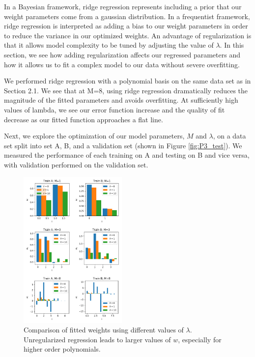 \documentclass[10pt, twocolumn]{article}
\begin{document}
In a Bayesian framework, ridge regression represents including a prior that our weight parameters come from a gaussian distribution. In a frequentist framework, ridge regression is interpreted as adding a bias to our weight parameters in order to reduce the variance in our optimized weights. An advantage of regularization is that it allows model complexity to be tuned by adjusting the value of $\lambda$. In this section, we see how adding regularization affects our regressed parameters and how it allows us to fit a complex model to our data without severe overfitting.


We performed ridge regression with a polynomial basis on the same data set as in Section 2.1. We see that at M=8, using ridge regression dramatically reduces the magnitude of the fitted parameters and avoids overfitting. At sufficiently high values of lambda, we see our error function increase and the quality of fit decrease as our fitted function approaches a flat line.


Next, we explore the optimization of our model parameters, $M$ and $\lambda$, on a data set split into set A, B, and a validation set (shown in Figure \ref{fig:P3_test}). We measured the performance of each training on A and testing on B and vice versa, with validation performed on the validation set.

\begin{figure}
\caption{Comparison of fitted weights using different values of $\lambda$. Unregularized regression leads to larger values of $w$, especially for higher order polynomials.}
\begin{center}
\includegraphics[width=200px]{P3_all_weights}
\end{center}
\label{fig:P3_all_weights}
\end{figure}
\end{document}
